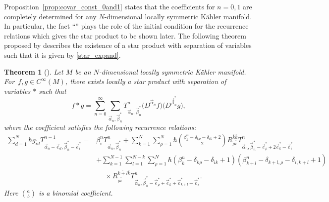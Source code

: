 \documentclass[pdftex]{sigma}
\numberwithin{equation}{section}
\newtheorem{Theorem}{Theorem}[section]
\begin{document}
Proposition~\ref{prop:covar_const_0and1} states that the coefficients for $n=0,1$ are completely determined for any $N$-dimensional locally symmetric K\"ahler manifold.
In particular,
the fact ``'' plays the role of the initial condition for the recurrence relations which
gives the star product to be shown later.
The following theorem proposed by %
\cite{HS1,HS2} describes the existence of a star product with separation of variables such that it is given by \eqref{star_expand}.

\begin{Theorem}[\cite{HS1,HS2}] \label{theorem:star_prd}
 Let $M$ be an $N$-dimensional locally symmetric K\"ahler manifold. For~${f,g
 \in
 C^{\infty}(M)}
 $,
 there exists locally a star product with separation of variables $\ast$ such that
 \[%
 f
 \ast
 g
 =
 \sum_{n=0}^{\infty}
 \sum_{\vec{\alpha}_{n},\vec{\beta}_{n}^{\ast}}
 T_{\vec{\alpha}_{n},\vec{\beta}_{n}^{\ast}}^{n}
 \bigl(
 D^{\vec{\alpha}_{n}}f
 \bigr)
 \bigl(
 D^{\vec{\beta}_{n}^{\ast}}g
 \bigr),
 \]
 where the coefficient
 satisfies the following recurrence relations:
 \begin{align}
 \sum_{d=1}^{N}
 \hbar
 g_{\overline{i}d}
 T_{\vec{\alpha}_{n}-\vec{e}_{d},\vec{\beta}_{n}^{\ast}-\vec{e}_{i}^{\ast}}^{n-1}
 ={}&
 \beta_{i}^{n}
 T_{\vec{\alpha}_{n},\vec{\beta}_{n}^{\ast}}^{n}
 +
 \sum_{k=1}^{N}
 \sum_{\rho=1}^{N}
 \hbar
 \binom{\beta_{k}^{n}-\delta_{k\rho}-\delta_{ik}+2}{2}
 R_{\overline{\rho}\overline{i}}^{\overline{k}\overline{k}}
 T_{\vec{\alpha}_{n},\vec{\beta}_{n}^{\ast}-\vec{e}_{\rho}^{\ast}+2\vec{e}_{k}^{\ast}-\vec{e}_{i}^{\ast}}^{n}
 \nonumber
 \\
 &
 +
 \sum_{k=1}^{N-1}
 \sum_{l=1}^{N-k}
 \sum_{\rho=1}^{N}
 \hbar
 (
 \beta_{k}^{n}
 -
 \delta_{k\rho}
 -
 \delta_{ik}
 +
 1
 )
 (
 \beta_{k+l}^{n}
 -
 \delta_{k+l,\rho}
 -
 \delta_{i,k+l}
 +
 1
 ) \nonumber\\
 &\phantom{+}{}\times
 R_{\overline{\rho}\overline{i}}^{\overline{k+l}\overline{k}}
 T_{
 \vec{\alpha}_{n},
 \vec{\beta}_{n}^{\ast}
 -
 \vec{e}_{\rho}^{\ast}
 +
 \vec{e}_{k}^{\ast}
 +
 \vec{e}_{k+l}^{\ast}
 -
 \vec{e}_{i}^{\ast}
 }^{n}.
 \label{HS_recrel}
 \end{align}
 Here
 $
 \binom{a}{b}
 $
 is a binomial coefficient.
\end{Theorem}
\end{document}
